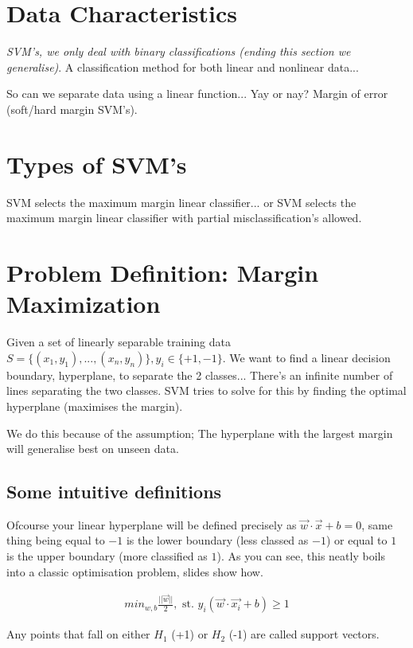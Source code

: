 \documentclass{article}
\begin{document}
\section{Data Characteristics}
{\em SVM's, we only deal with binary classifications (ending this section we generalise)}. A classification method for both linear and nonlinear data...

So can we separate data using a linear function... Yay or nay? Margin of error (soft/hard margin SVM's).

\section{Types of SVM's}
SVM selects the maximum margin linear classifier... or SVM selects the maximum margin linear classifier with partial misclassification's allowed.

\section{Problem Definition: Margin Maximization}
Given a set of linearly separable training data $S = \{(x_1,y_1), ..., (x_n,y_n)\}, y_i \in \{+1, -1\}$. We want to find a linear decision boundary, hyperplane, to separate the 2 classes... There's an infinite number of lines separating the two classes. SVM tries to solve for this by finding the optimal hyperplane (maximises the margin).

We do this because of the assumption; The hyperplane with the largest margin will generalise best on unseen data.

\subsection{Some intuitive definitions}
Ofcourse your linear hyperplane will be defined precisely as $\overset{\rightarrow}{w}\cdot \overset{\rightarrow}{x} + b = 0$, same thing being equal to $-1$ is the lower boundary (less classed as $-1$) or equal to $1$ is the upper boundary (more classified as $1$). As you can see, this neatly boils into a classic optimisation problem, slides show how.

\begin{align*}
	min_{w,b} \frac{||\overset{\rightarrow}{w}||}{2}, \text{ st. } y_i(\overset{\rightarrow}{w} \cdot \overset{\rightarrow}{x_i} + b) \geq 1
\end{align*}

Any points that fall on either $H_1$ (+1) or $H_2$ (-1) are called support vectors.
\end{document}
